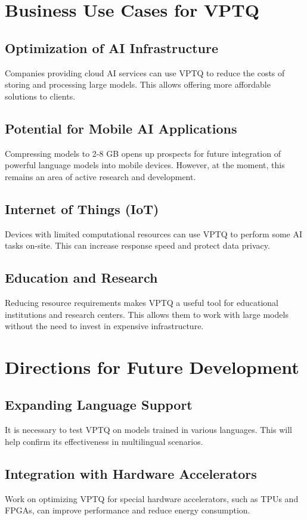 \documentclass{article}
\begin{document}
\section{Business Use Cases for VPTQ}

\subsection{Optimization of AI Infrastructure}
Companies providing cloud AI services can use VPTQ to reduce the costs of storing and processing large models. This allows offering more affordable solutions to clients.

\subsection{Potential for Mobile AI Applications}
Compressing models to 2-8 GB opens up prospects for future integration of powerful language models into mobile devices. However, at the moment, this remains an area of active research and development.

\subsection{Internet of Things (IoT)}
Devices with limited computational resources can use VPTQ to perform some AI tasks on-site. This can increase response speed and protect data privacy.

\subsection{Education and Research}
Reducing resource requirements makes VPTQ a useful tool for educational institutions and research centers. This allows them to work with large models without the need to invest in expensive infrastructure.

\section{Directions for Future Development}

\subsection{Expanding Language Support}
It is necessary to test VPTQ on models trained in various languages. This will help confirm its effectiveness in multilingual scenarios.

\subsection{Integration with Hardware Accelerators}
Work on optimizing VPTQ for special hardware accelerators, such as TPUs and FPGAs, can improve performance and reduce energy consumption.
\end{document}
